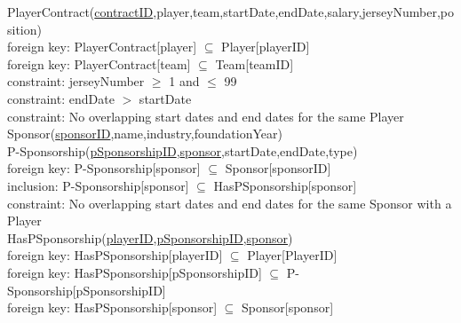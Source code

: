 {\color{ForestGreen}PlayerContract(\underline{contractID},player,team,startDate,endDate,salary,jerseyNumber,position)}\\
{\color{Orange}\hspace{2mm} foreign key: {\color{Magenta}PlayerContract[player] $\subseteq$ Player[playerID]}} \\
{\color{Orange}\hspace{2mm} foreign key: {\color{Magenta}PlayerContract[team] $\subseteq$ Team[teamID]}} \\
{\color{Orange}\hspace{2mm} constraint: {\color{Magenta}jerseyNumber $\geqslant$  1 and $\leqslant$ 99}} \\
{\color{Orange}\hspace{2mm} constraint: {\color{Magenta}endDate $>$ startDate}} \\
{\color{Orange}\hspace{2mm} constraint: {\color{Magenta}No overlapping start dates and end dates for the same Player}} \\

{\color{ForestGreen}Sponsor(\underline{sponsorID},name,industry,foundationYear)}\\

{\color{ForestGreen}P-Sponsorship(\underline{pSponsorshipID},\underline{sponsor},startDate,endDate,type)}\\
{\color{Orange}\hspace{2mm} foreign key: {\color{Magenta}P-Sponsorship[sponsor] $\subseteq$ Sponsor[sponsorID]}} \\
{\color{Orange}\hspace{2mm} inclusion: {\color{Magenta}P-Sponsorship[sponsor] $\subseteq$ HasPSponsorship[sponsor]}} \\
{\color{Orange}\hspace{2mm} constraint: {\color{Magenta}No overlapping start dates and end dates for the same Sponsor with a Player}} \\

{\color{ForestGreen}HasPSponsorship(\underline{playerID},\underline{pSponsorshipID},\underline{sponsor})}\\
{\color{Orange}\hspace{2mm} foreign key: {\color{Magenta}HasPSponsorship[playerID] $\subseteq$ Player[PlayerID]}} \\
{\color{Orange}\hspace{2mm} foreign key: {\color{Magenta}HasPSponsorship[pSponsorshipID] $\subseteq$ P-Sponsorship[pSponsorshipID]}} \\
{\color{Orange}\hspace{2mm} foreign key: {\color{Magenta}HasPSponsorship[sponsor] $\subseteq$ Sponsor[sponsor]}} \\

